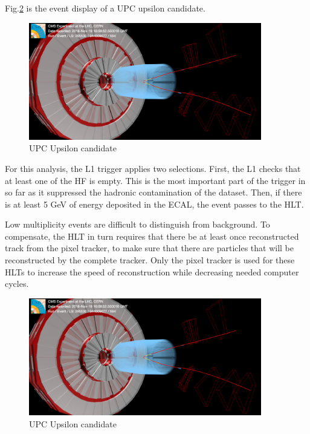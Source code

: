 Fig.\ref{fig:eventdisplayUPCUps} is the event display of a UPC upsilon candidate.

\begin{figure}[h!]
\begin{centering}
\includegraphics[width=4in]{Chapter3/importfigs/upcJpsi_run285530_lumi594_event944509077_v0.png}
\par\end{centering}
\caption{UPC Upsilon candidate \label{fig:eventdisplayUPCUps}}
\end{figure}

For this analysis, the L1 trigger applies two selections. First, the L1 checks that at least one of the HF is empty. This is the most important part of the trigger in so far as it suppressed the hadronic contamination of the dataset. Then, if there is at least 5 GeV of energy deposited in the ECAL, the event passes to the HLT. 

Low multiplicity events are difficult to distinguish from background. To compensate, the HLT in turn requires that there be at least once reconstructed track from the pixel tracker, to make sure that there are particles that will be reconstructed by the complete tracker. Only the pixel tracker is used for these HLTs to increase the speed of reconstruction while decreasing needed computer cycles. 

\begin{figure}[h!]
\begin{centering}
\includegraphics[width=4in]{Chapter3/importfigs/upcJpsi_run285530_lumi594_event944509077_v0.png}
\par\end{centering}
\caption{UPC Upsilon candidate \label{fig:eventdisplayUPCUps}}
\end{figure}


